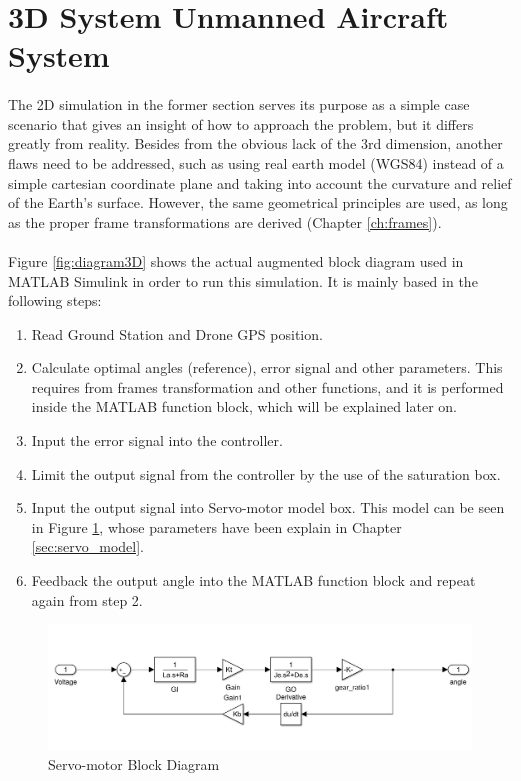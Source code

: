 \newpage
\section{3D System Unmanned Aircraft System}\label{sec:3d_sim}

\paragraph{}The 2D simulation in the former section serves its purpose as a simple case scenario that gives an insight of how to approach the problem, but it differs greatly from reality. Besides from the obvious lack of the 3rd dimension, another flaws need to be addressed, such as using real earth model (WGS84) instead of a simple cartesian coordinate plane  and taking into account the curvature and relief of the Earth's surface. However, the same geometrical principles are used, as long as the proper frame transformations are derived (Chapter \ref{ch:frames}).

\paragraph{} Figure \ref{fig:diagram3D} shows the actual augmented block diagram used in MATLAB Simulink in order to run this simulation. It is mainly based in the following steps:
\begin{enumerate}
\item{Read Ground Station and Drone GPS position.}
\item{Calculate optimal angles (reference), error signal and other parameters. This requires from frames transformation and other functions, and it is performed inside the MATLAB function block, which will be explained later on.}
\item{Input the error signal into the controller.}
\item{Limit the output signal from the controller by the use of the saturation box.}
\item{Input the output signal into Servo-motor model box. This model can be seen in Figure \ref{fig:servomotor3D}, whose parameters have been explain in Chapter \ref{sec:servo_model}.}
\item{Feedback the output angle into the MATLAB function block and repeat again from step 2.}
\end{enumerate}

\begin{figure}[h]
	\centering
	\includegraphics[width=1.1\textwidth]{figures/servomotor_3D.png}
	\caption{Servo-motor Block Diagram}
   	\label{fig:servomotor3D}
\end{figure}

